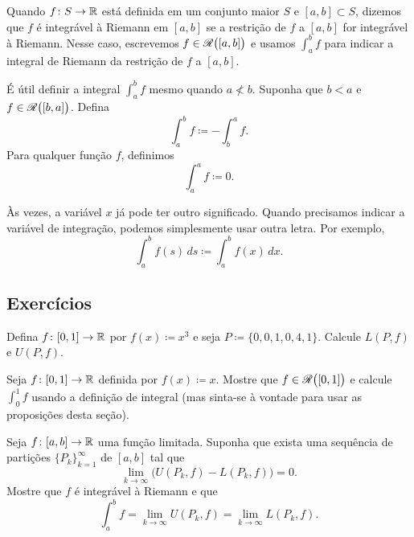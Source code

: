 Quando $f \colon S \to {\mathbb{R}}$ está definida em um conjunto maior $S$ e
$[a,b] \subset S$,
dizemos que $f$ é integrável à Riemann em $[a,b]$ se a restrição de $f$
a $[a,b]$ for integrável à Riemann.
Nesse caso, escrevemos $f \in {\mathscr{R}}\bigl([a,b]\bigr)$
e usamos $\int_a^b f$ para indicar a integral de Riemann
da restrição de $f$ a $[a,b]$.

É útil definir a integral $\int_a^b f$ mesmo quando
$a \nless b$. Suponha que $b < a$ e $f \in {\mathscr{R}}\bigl([b,a]\bigr)$.
Defina
\begin{equation*}
\int_a^b f \coloneqq - \int_b^a f .
\end{equation*}
Para qualquer função $f$, definimos
\begin{equation*}
\int_a^a f \coloneqq 0 .
\end{equation*}

Às vezes, a variável $x$ já pode ter outro significado. Quando
precisamos indicar a variável de integração, podemos simplesmente
usar outra letra. Por exemplo,
\begin{equation*}
\int_a^b f(s)\,ds \coloneqq \int_a^b f(x)\,dx .
\end{equation*}

\subsection{Exercícios}

\begin{exercise}
Defina $f \colon [0,1] \to {\mathbb{R}}$ por $f(x) \coloneqq x^3$
e seja $P \coloneqq \{ 0, 0{,}1, 0{,}4, 1 \}$. Calcule $L(P,f)$ e $U(P,f)$.
\end{exercise}

\begin{exercise}
Seja $f \colon [0,1] \to {\mathbb{R}}$ definida por $f(x) \coloneqq x$.
Mostre que $f \in {\mathscr{R}}\bigl([0,1]\bigr)$ e
calcule $\int_0^1 f$ usando a definição de integral
(mas sinta-se à vontade para usar as proposições desta seção).%
\end{exercise}

\begin{exercise}
Seja $f \colon [a,b] \to {\mathbb{R}}$ uma função limitada.
Suponha que exista uma sequência de partições $\{ P_k \}_{k=1}^\infty$ de $[a,b]$
tal que
\begin{equation*}
\lim_{k \to \infty} \bigl( U(P_k,f) - L(P_k,f) \bigr) = 0 .
\end{equation*}
Mostre que $f$ é integrável à Riemann e que
\begin{equation*}
\int_a^b f = 
\lim_{k \to \infty} U(P_k,f)
=
\lim_{k \to \infty} L(P_k,f) .
\end{equation*}
\end{exercise}

